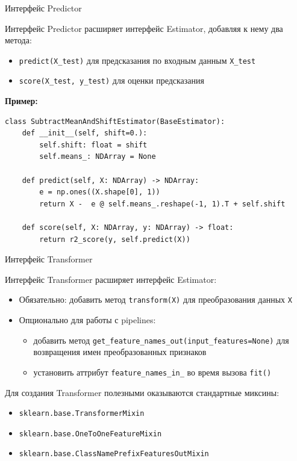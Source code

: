 \documentclass{beamer}
\begin{document}
\begin{frame}[fragile]{Интерфейс Predictor}
    \scriptsize

    Интерфейс Predictor расширяет интерфейс Estimator, добавляя к нему два метода:
    \begin{itemize}
        \item \texttt{predict(X\_test)} для предсказания по входным данным \texttt{X\_test}
        \item \texttt{score(X\_test, y\_test)} для оценки предсказания
    \end{itemize}

    \textbf{Пример:}
    \begin{lstlisting}
class SubtractMeanAndShiftEstimator(BaseEstimator):
    def __init__(self, shift=0.):
        self.shift: float = shift
        self.means_: NDArray = None

    def predict(self, X: NDArray) -> NDArray:
        e = np.ones((X.shape[0], 1))
        return X -  e @ self.means_.reshape(-1, 1).T + self.shift

    def score(self, X: NDArray, y: NDArray) -> float:
        return r2_score(y, self.predict(X))\end{lstlisting}
\end{frame}

\begin{frame}{Интерфейс Transformer}
    \small

    Интерфейс Transformer расширяет интерфейс Estimator:
    \begin{itemize}
        \item Обязательно: добавить метод \texttt{transform(X)} для преобразования данных \texttt{X}
        \item Опционально для работы с pipelines:
        \begin{itemize}
            \scriptsize
            \item добавить метод \texttt{get\_feature\_names\_out(input\_features=None)} для возвращения имен преобразованных признаков
            \item установить аттрибут \texttt{feature\_names\_in\_} во время вызова \texttt{fit()}
        \end{itemize}
    \end{itemize}

    Для создания Transformer полезными оказываются стандартные миксины:
    \begin{itemize}
        \item \texttt{sklearn.base.TransformerMixin}
        \item \texttt{sklearn.base.OneToOneFeatureMixin}
        \item \texttt{sklearn.base.ClassNamePrefixFeaturesOutMixin}
    \end{itemize}
\end{frame}
\end{document}

